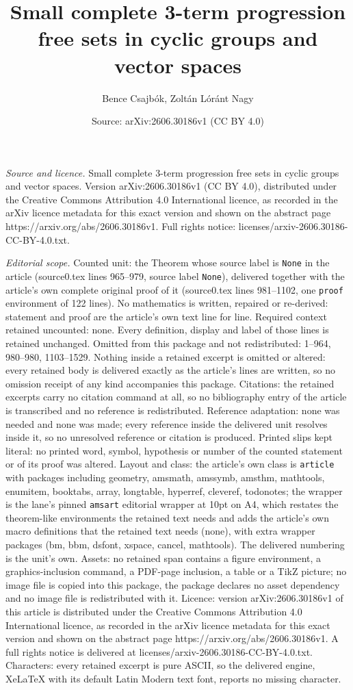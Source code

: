 \documentclass[10pt,a4paper]{amsart}
\title[Small complete 3-term progression free sets in cyclic groups]{Small complete 3-term progression free sets in cyclic groups and vector spaces}
\author{Bence Csajb\'ok, Zolt\'an L\'or\'ant Nagy}
\date{Source: arXiv:2606.30186v1 (CC BY 4.0)}
\begin{document}
\maketitle

\noindent\emph{Source and licence.} Small complete 3-term progression free sets in cyclic groups and vector spaces. Version arXiv:2606.30186v1 (CC BY 4.0), distributed under the Creative Commons Attribution 4.0 International licence, as recorded in the arXiv licence metadata for this exact version and shown on the abstract page https://arxiv.org/abs/2606.30186v1. Full rights notice: licenses/arxiv-2606.30186-CC-BY-4.0.txt.\par\smallskip

\noindent\textit{Editorial scope.} Counted unit: the Theorem whose source label is \texttt{None} in the article (source0.tex lines 965--979, source label \texttt{None}), delivered together with the article's own complete original proof of it (source0.tex lines 981--1102, one \texttt{proof} environment of 122 lines). No mathematics is written, repaired or re-derived: statement and proof are the article's own text line for line. Required context retained uncounted: none. Every definition, display and label of those lines is retained unchanged. Omitted from this package and not redistributed: 1--964, 980--980, 1103--1529. Nothing inside a retained excerpt is omitted or altered: every retained body is delivered exactly as the article's lines are written, so no omission receipt of any kind accompanies this package. Citations: the retained excerpts carry no citation command at all, so no bibliography entry of the article is transcribed and no reference is redistributed. Reference adaptation: none was needed and none was made; every reference inside the delivered unit resolves inside it, so no unresolved reference or citation is produced. Printed slips kept literal: no printed word, symbol, hypothesis or number of the counted statement or of its proof was altered. Layout and class: the article's own class is \texttt{article} with packages including geometry, amsmath, amssymb, amsthm, mathtools, enumitem, booktabs, array, longtable, hyperref, cleveref, todonotes; the wrapper is the lane's pinned \texttt{amsart} editorial wrapper at 10pt on A4, which restates the theorem-like environments the retained text needs and adds the article's own macro definitions that the retained text needs (none), with extra wrapper packages (bm, bbm, dsfont, xspace, cancel, mathtools). The delivered numbering is the unit's own. Assets: no retained span contains a figure environment, a graphics-inclusion command, a PDF-page inclusion, a table or a TikZ picture; no image file is copied into this package, the package declares no asset dependency and no image file is redistributed with it. Licence: version arXiv:2606.30186v1 of this article is distributed under the Creative Commons Attribution 4.0 International licence, as recorded in the arXiv licence metadata for this exact version and shown on the abstract page https://arxiv.org/abs/2606.30186v1. A full rights notice is delivered at licenses/arxiv-2606.30186-CC-BY-4.0.txt. Characters: every retained excerpt is pure ASCII, so the delivered engine, XeLaTeX with its default Latin Modern text font, reports no missing character.
\end{document}
